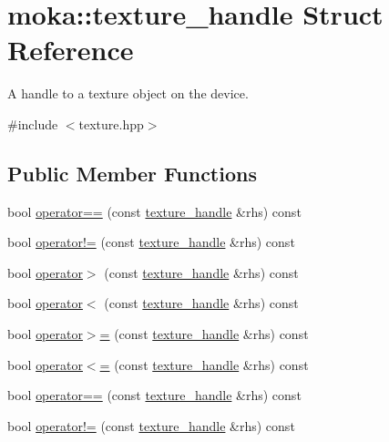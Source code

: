 \hypertarget{structmoka_1_1texture__handle}{}\section{moka\+::texture\+\_\+handle Struct Reference}
\label{structmoka_1_1texture__handle}


A handle to a texture object on the device.  




{\ttfamily \#include $<$texture.\+hpp$>$}

\subsection*{Public Member Functions}
\begin{DoxyCompactItemize}
\item 
bool \mbox{\hyperlink{structmoka_1_1texture__handle_a3b3c615c09b9b4e36ae970286ed4612b}{operator==}} (const \mbox{\hyperlink{structmoka_1_1texture__handle}{texture\+\_\+handle}} \&rhs) const
\item 
bool \mbox{\hyperlink{structmoka_1_1texture__handle_aac5e6455e729c16683add7bff4931165}{operator!=}} (const \mbox{\hyperlink{structmoka_1_1texture__handle}{texture\+\_\+handle}} \&rhs) const
\item 
bool \mbox{\hyperlink{structmoka_1_1texture__handle_abddd549d0ed65bb69d4542a5d4f7569a}{operator$>$}} (const \mbox{\hyperlink{structmoka_1_1texture__handle}{texture\+\_\+handle}} \&rhs) const
\item 
bool \mbox{\hyperlink{structmoka_1_1texture__handle_a95f0ca42db2cbb2f41f0b8ec2ec44863}{operator$<$}} (const \mbox{\hyperlink{structmoka_1_1texture__handle}{texture\+\_\+handle}} \&rhs) const
\item 
bool \mbox{\hyperlink{structmoka_1_1texture__handle_a21e800c656613a89c69f96c522bd3e9c}{operator$>$=}} (const \mbox{\hyperlink{structmoka_1_1texture__handle}{texture\+\_\+handle}} \&rhs) const
\item 
bool \mbox{\hyperlink{structmoka_1_1texture__handle_ac5ddcdc527e92d6ac4affd53d0628d89}{operator$<$=}} (const \mbox{\hyperlink{structmoka_1_1texture__handle}{texture\+\_\+handle}} \&rhs) const
\item 
bool \mbox{\hyperlink{structmoka_1_1texture__handle_a3b3c615c09b9b4e36ae970286ed4612b}{operator==}} (const \mbox{\hyperlink{structmoka_1_1texture__handle}{texture\+\_\+handle}} \&rhs) const
\item 
bool \mbox{\hyperlink{structmoka_1_1texture__handle_aac5e6455e729c16683add7bff4931165}{operator!=}} (const \mbox{\hyperlink{structmoka_1_1texture__handle}{texture\+\_\+handle}} \&rhs) const

\end{DoxyCompactItemize}
